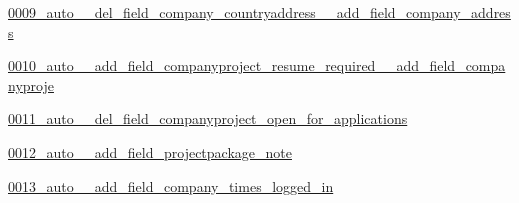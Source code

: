 \begin{DoxyCompactItemize}
\item 
\hyperlink{namespacecompanies_1_1migrations_1_10009__auto____del__field__company__countryaddress____add__field__company__address}{0009\-\_\-auto\-\_\-\-\_\-del\-\_\-field\-\_\-company\-\_\-countryaddress\-\_\-\-\_\-add\-\_\-field\-\_\-company\-\_\-address}
\item 
\hyperlink{namespacecompanies_1_1migrations_1_10010__auto____add__field__companyproject__resume__required____add__field__companyproje}{0010\-\_\-auto\-\_\-\-\_\-add\-\_\-field\-\_\-companyproject\-\_\-resume\-\_\-required\-\_\-\-\_\-add\-\_\-field\-\_\-companyproje}
\item 
\hyperlink{namespacecompanies_1_1migrations_1_10011__auto____del__field__companyproject__open__for__applications}{0011\-\_\-auto\-\_\-\-\_\-del\-\_\-field\-\_\-companyproject\-\_\-open\-\_\-for\-\_\-applications}
\item 
\hyperlink{namespacecompanies_1_1migrations_1_10012__auto____add__field__projectpackage__note}{0012\-\_\-auto\-\_\-\-\_\-add\-\_\-field\-\_\-projectpackage\-\_\-note}
\item 
\hyperlink{namespacecompanies_1_1migrations_1_10013__auto____add__field__company__times__logged__in}{0013\-\_\-auto\-\_\-\-\_\-add\-\_\-field\-\_\-company\-\_\-times\-\_\-logged\-\_\-in}
\end{DoxyCompactItemize}
